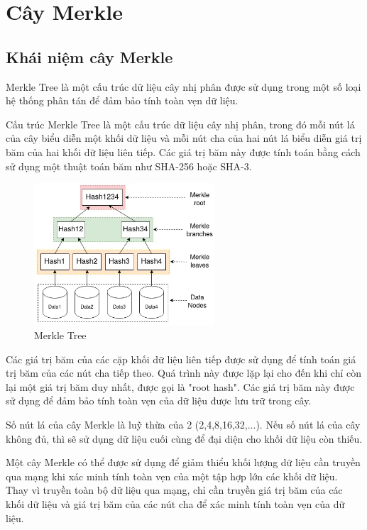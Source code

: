 \section{Cây Merkle}
\subsection{Khái niệm cây Merkle}

Merkle Tree là một cấu trúc dữ liệu cây nhị phân được sử dụng trong một số loại hệ thống phân 
tán để đảm bảo tính toàn vẹn dữ liệu. 

Cấu trúc Merkle Tree là một cấu trúc dữ liệu cây nhị phân, trong đó mỗi nút lá của cây biểu diễn
một khối dữ liệu và mỗi nút cha của hai nút lá biểu diễn giá trị băm của hai khối dữ 
liệu liên tiếp. Các giá trị băm này được tính toán bằng cách sử dụng một thuật toán băm như 
SHA-256 hoặc SHA-3.


\begin{figure}[h]
    \centering
    \includegraphics[width=0.6\textwidth]{images/Merkle_Tree.png}
    \caption{Merkle Tree }
    \label{fig:merkle_tree}
\end{figure}

Các giá trị băm của các cặp khối dữ liệu liên tiếp được sử dụng để tính toán giá trị băm của 
các nút cha tiếp theo. Quá trình này được lặp lại cho đến khi chỉ còn lại một giá trị băm duy 
nhất, được gọi là "root hash". Các giá trị băm này được sử dụng để đảm bảo tính toàn vẹn của 
dữ liệu được lưu trữ trong cây.

Số nút lá của cây Merkle là luỹ thừa của 2 (2,4,8,16,32,...). Nếu số nút lá của cây không
đủ, thì sẽ sử dụng dữ liệu cuối cùng để đại diện cho khối dữ liệu còn thiếu.



Một cây Merkle có thể được sử dụng để giảm thiểu khối lượng dữ liệu cần truyền qua mạng khi 
xác minh tính toàn vẹn của một tập hợp lớn các khối dữ liệu. Thay vì truyền toàn bộ dữ liệu qua
mạng, chỉ cần truyền giá trị băm của các khối dữ liệu và giá trị băm của các nút cha để xác minh tính toàn vẹn của dữ liệu.

